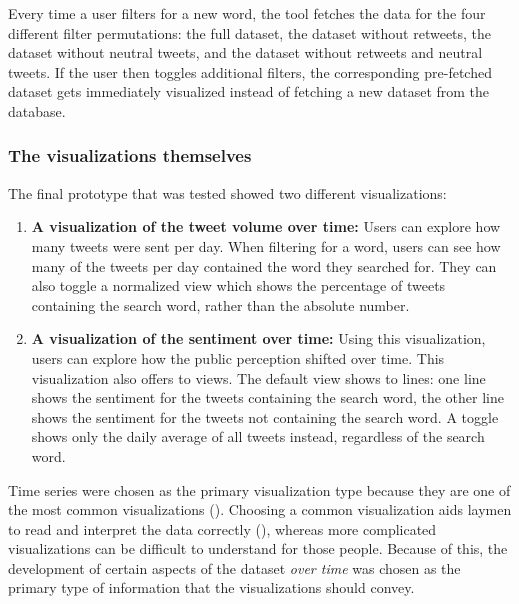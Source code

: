 Every time a user filters for a new word, the tool fetches the data for the four different filter permutations: the full dataset, the dataset without retweets, the dataset without neutral tweets, and the dataset without retweets and neutral tweets. If the user then toggles additional filters, the corresponding pre-fetched dataset gets immediately visualized instead of fetching a new dataset from the database.

\subsubsection{The visualizations themselves}
The final prototype that was tested showed two different visualizations:
\begin{enumerate}
    \item \textbf{A visualization of the tweet volume over time:} Users can explore how many tweets were sent per day. When filtering for a word, users can see how many of the tweets per day contained the word they searched for. They can also toggle a normalized view which shows the percentage of tweets containing the search word, rather than the absolute number.
    \item \textbf{A visualization of the sentiment over time:} Using this visualization, users can explore how the public perception shifted over time. This visualization also offers to views. The default view shows to lines: one line shows the sentiment for the tweets containing the search word, the other line shows the sentiment for the tweets not containing the search word. A toggle shows only the daily average of all tweets instead, regardless of the search word.
\end{enumerate}


Time series were chosen as the primary visualization type because they are one of the most common visualizations (\cite{heer2010}). Choosing a common visualization aids laymen to read and interpret the data correctly (\cite{borner2016}), whereas more complicated visualizations can be difficult to understand for those people. Because of this, the development of certain aspects of the dataset \emph{over time} was chosen as the primary type of information that the visualizations should convey.

